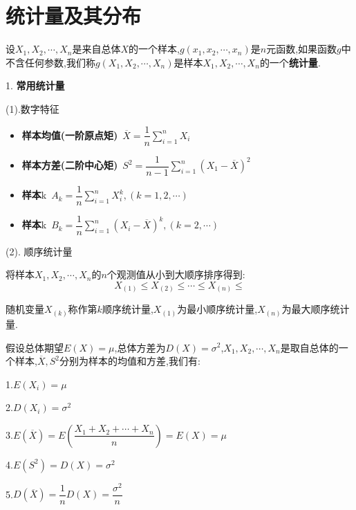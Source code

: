 \section{统计量及其分布}
\begin{definition}
	设$X_{1},X_{2},\cdots,X_{n}$是来自总体$X$的一个样本,$g(x_{1},x_{2},\cdots,x_{n})$是$n$元函数,如果函数$g$中不含任何参数,我们称$g(X_{1},X_{2},\cdots,X_{n})$是样本$X_{1},X_{2},\cdots,X_{n}$的一个\textbf{统计量}.
	
	1. \textbf{常用统计量}
	
	(1).数字特征
	\begin{itemize}
		\item \textbf{样本均值(一阶原点矩)}\ $\overline{X}=\dfrac{1}{n}\sum\limits_{i=1}^{n}X_{i}$
		\item \textbf{样本方差(二阶中心矩)}\ $S^2=\dfrac{1}{n-1}\sum\limits_{i=1}^{n}(X_{1}-\overline{X})^2$
		\item \textbf{样本}k\ $A_{k}=\dfrac{1}{n}\sum\limits_{i=1}^{n}X_{i}^{k},(k=1,2,\cdots)$
		\item \textbf{样本}k\ $B_{k}=\dfrac{1}{n}\sum\limits_{i=1}^{n}(X_{i}-\overline{X})^{k},(k=2,\cdots)$
	\end{itemize}
	
	(2). 顺序统计量
	
	将样本$X_{1},X_{2},\cdots,X_{n}$的$n$个观测值从小到大顺序排序得到: 
	$$X_{(1)}\leq X_{(2)}\leq \cdots\leq X_{(n)}\leq$$
	
	随机变量$X_{(k)}$称作第$k$顺序统计量,$X_{(1)}$为最小顺序统计量,$X_{(n)}$为最大顺序统计量.
	\begin{anymark}[注]
		假设总体期望$E(X)=\mu$,总体方差为$D(X)=\sigma^2$,$X_{1},X_{2},\cdots,X_{n}$是取自总体的一个样本,$\overline{X},S^2$分别为样本的均值和方差,我们有: 
		
		1.$E(X_{i})=\mu$
		
		2.$D(X_{i})=\sigma^2$
		
		3.$E(\overline{X})=E(\dfrac{X_{1}+X_{2}+\cdots+X_{n}}{n})=E(X)=\mu$
		
		4.$E(S^2)=D(X)=\sigma^2$
		
		5.$D(\overline{X})=\dfrac{1}{n}D(X)=\dfrac{\sigma^2}{n}$
	\end{anymark}
\end{definition}

